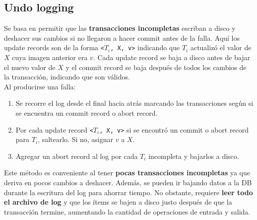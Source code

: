 \subsection*{Undo logging}
Se basa en permitir que las \textbf{transacciones incompletas} escriban a disco y deshacer sus cambios si no llegaron a hacer commit antes de la falla. Aquí los update records son de la forma \texttt{<$T_i$, X, v>} indicando que $T_i$ actualizó el valor de $X$ cuya imagen anterior era $v$. Cada update record se baja a disco antes de bajar el nuevo valor de $X$ y el commit record se baja después de todos los cambios de la transacción, indicando que son válidos. \\
Al producirse una falla:
\begin{enumerate}
    \item Se recorre el log desde el final hacia atrás marcando las transacciones según si se encuentra un commit record o abort record.
    \item Por cada update record \texttt{<$T_i$, X, v>} si se encontró un commit o abort record para $T_i$, saltearlo. Si no, asignar $v$ a $X$.
    \item Agregar un abort record al log por cada $T_i$ incompleta y bajarlos a disco.
\end{enumerate}
Este método es conveniente al tener \textbf{pocas transacciones incompletas} ya que deriva en pocos cambios a deshacer. Además, se pueden ir bajando datos a la DB durante la escritura del log para ahorrar tiempo. No obstante, requiere \textbf{leer todo el archivo de log} y que los ítems se bajen a disco justo después de que la transacción termine, aumentando la cantidad de operaciones de entrada y salida.

